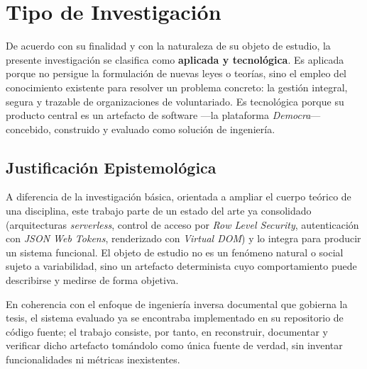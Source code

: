 \section{Tipo de Investigaci\'on}

De acuerdo con su finalidad y con la naturaleza de su objeto de estudio, la
presente investigaci\'on se clasifica como \textbf{aplicada y tecnol\'ogica}. Es
aplicada porque no persigue la formulaci\'on de nuevas leyes o teor\'ias, sino el
empleo del conocimiento existente para resolver un problema concreto: la gesti\'on
integral, segura y trazable de organizaciones de voluntariado. Es tecnol\'ogica
porque su producto central es un artefacto de software ---la plataforma
\textit{Democra}--- concebido, construido y evaluado como soluci\'on de ingenier\'ia.

\subsection{Justificaci\'on Epistemol\'ogica}

A diferencia de la investigaci\'on b\'asica, orientada a ampliar el cuerpo
te\'orico de una disciplina, este trabajo parte de un estado del arte ya
consolidado (arquitecturas \textit{serverless}, control de acceso por
\textit{Row Level Security}, autenticaci\'on con \textit{JSON Web Tokens},
renderizado con \textit{Virtual DOM}) y lo integra para producir un sistema
funcional. El objeto de estudio no es un fen\'omeno natural o social sujeto a
variabilidad, sino un artefacto determinista cuyo comportamiento puede
describirse y medirse de forma objetiva.

En coherencia con el enfoque de ingenier\'ia inversa documental que gobierna la
tesis, el sistema evaluado ya se encontraba implementado en su repositorio de
c\'odigo fuente; el trabajo consiste, por tanto, en reconstruir, documentar y
verificar dicho artefacto tom\'andolo como \'unica fuente de verdad, sin inventar
funcionalidades ni m\'etricas inexistentes.
